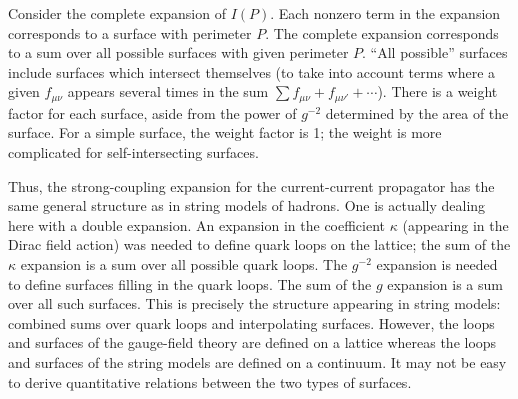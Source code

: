 Consider the complete expansion of $I(P)$.  Each nonzero term in the
expansion corresponds to a surface with perimeter $P$.  The complete
expansion corresponds to a sum over all possible surfaces with given
perimeter $P$.  ``All possible'' surfaces include surfaces which
intersect themselves (to take into account terms where a given
$f_{\mu\nu}$ appears several times in the sum
$\sum f_{\mu\nu} + f_{\mu\nu'} + \cdots$).  There is a weight factor for
each surface, aside from the power of $g^{-2}$ determined by the area of
the surface.  For a simple surface, the weight factor is 1; the weight is
more complicated for self-intersecting surfaces.

Thus, the strong-coupling expansion for the current-current propagator
has the same general structure as in string models of hadrons.  One is
actually dealing here with a double expansion.  An expansion in the
coefficient $\kappa$ (appearing in the Dirac field action) was needed to
define quark loops on the lattice; the sum of the $\kappa$ expansion is a
sum over all possible quark loops.  The $g^{-2}$ expansion is needed to
define surfaces filling in the quark loops.  The sum of the $g$ expansion
is a sum over all such surfaces.  This is precisely the structure
appearing in string models:  combined sums over quark loops and
interpolating surfaces.  However, the loops and surfaces of the
gauge-field theory are defined on a lattice whereas the loops and
surfaces of the string models are defined on a continuum.  It may not be
easy to derive quantitative relations between the two types of surfaces.
